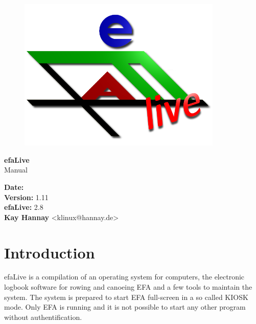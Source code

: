 \documentclass[a4paper,12pt,twoside]{article}
\title{\Title}
\author{\Author}
\date{\DocDate}
\begin{document}

\begin{titlepage}
    \vspace*{1cm}
    \begin{center}
        \begin{figure}
            \centering
            \includegraphics[width=9.745cm,height=7.308cm]{screenshots/efaLiveen-img1.png}
        \end{figure}
        \Huge
        \textbf{efaLive} \\[0.1cm]
        \LARGE
        Manual \\[5cm]
    \end{center}
    \normalsize
    \vspace*{4cm}
    \textbf{Date:} {\DocDate} \\
    \textbf{Version:} 1.11 \\
    \textbf{efaLive:} 2.8 \\
    \textbf{Kay Hannay} <klinux@hannay.de> \\
\end{titlepage}


\tableofcontents
\clearpage\setcounter{page}{1}
\section{Introduction}
efaLive is a compilation of an operating system for computers, the electronic
logbook software for rowing and canoeing EFA and a few tools to maintain the 
system. The system is prepared to start EFA full-screen in a so called KIOSK 
mode. Only EFA is running and it is not possible to start any other program 
without authentification.
\end{document}
